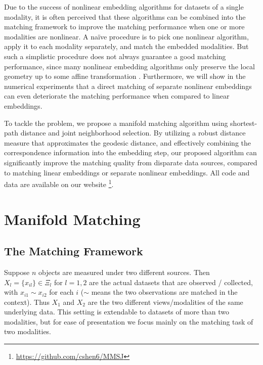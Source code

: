 \documentclass[times,twocolumn,final]{elsarticle}
\begin{document}
Due to the success of nonlinear embedding algorithms for datasets of a single modality, it is often perceived that these algorithms can be combined into the matching framework to improve the matching performance when one or more modalities are nonlinear. A na\"ive procedure is to pick one nonlinear algorithm, apply it to each modality separately, and match the embedded modalities. But such a simplistic procedure does not always guarantee a good matching performance, since many nonlinear embedding algorithms only preserve the local geometry up to some affine transformation \citep{GoldbergRitov2008}. Furthermore, we will show in the numerical experiments that a direct matching of separate nonlinear embeddings can even deteriorate the matching performance when compared to linear embeddings.

To tackle the problem, we propose a manifold matching algorithm using shortest-path distance and joint neighborhood selection. By utilizing a robust distance measure that approximates the geodesic distance, and effectively combining the correspondence information into the embedding step, our proposed algorithm can significantly improve the matching quality from disparate data sources, compared to matching linear embeddings or separate nonlinear embeddings. All code and data are available on our website \footnote{\url{https://github.com/cshen6/MMSJ}}.

\section{Manifold Matching}
\label{main}

\subsection{The Matching Framework}
\label{bg}
Suppose $n$ objects are measured under two different sources. Then $X_{l}=\{x_{il}\} \in \Xi_{l}$ for $l=1, 2$ are the actual datasets that are observed / collected, with $x_{i1} \sim x_{i2}$ for each $i$ ($\sim$ means the two observations are matched in the context). Thus $X_{1}$ and $X_{2}$ are the two different views/modalities of the same underlying data. This setting is extendable to datasets of more than two modalities, but for ease of presentation we focus mainly on the matching task of two modalities.
\end{document}

